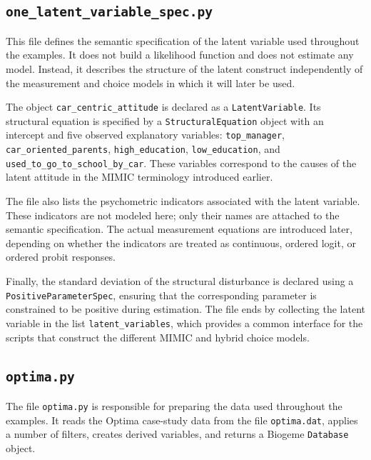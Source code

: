 \documentclass[12pt,a4paper]{article}
\begin{document}
\subsection{\lstinline$one_latent_variable_spec.py$}
\label{sec:one_latent_variable_spec.py}


This file defines the semantic specification of the latent variable
used throughout the examples. It does not build a likelihood function
and does not estimate any model. Instead, it describes the structure
of the latent construct independently of the measurement and choice
models in which it will later be used.

The object \lstinline$car_centric_attitude$ is declared as a
\lstinline$LatentVariable$. Its structural equation is specified by a
\lstinline$StructuralEquation$ object with an intercept and five
observed explanatory variables:
\lstinline$top_manager$,
\lstinline$car_oriented_parents$,
\lstinline$high_education$,
\lstinline$low_education$, and
\lstinline$used_to_go_to_school_by_car$. These variables correspond to
the causes of the latent attitude in the MIMIC terminology introduced
earlier.

The file also lists the psychometric indicators associated with the
latent variable. These indicators are not modeled here; only their
names are attached to the semantic specification. The actual
measurement equations are introduced later, depending on whether the
indicators are treated as continuous, ordered logit, or ordered
probit responses.

Finally, the standard deviation of the structural disturbance is
declared using a \lstinline$PositiveParameterSpec$, ensuring that the
corresponding parameter is constrained to be positive during
estimation. The file ends by collecting the latent variable in the
list \lstinline$latent_variables$, which provides a common interface
for the scripts that construct the different MIMIC and hybrid choice
models.

\subsection{\lstinline$optima.py$}
\label{sec:optima.py}


The file \lstinline$optima.py$ is responsible for preparing the data
used throughout the examples. It reads the Optima case-study data from
the file \lstinline$optima.dat$, applies a number of filters, creates
derived variables, and returns a Biogeme \lstinline$Database$ object.
\end{document}
